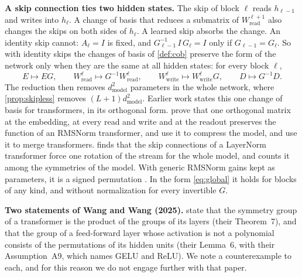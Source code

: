\documentclass[10pt]{article}
\theoremstyle{definition}
\theoremstyle{remark}
\newcommand{\Wread}{W_{\mathrm{read}}}
\newcommand{\Wwrite}{W_{\mathrm{write}}}
\newcommand{\dm}{d_{\mathrm{model}}}
\newcommand{\para}[1]{\smallskip\noindent\textbf{#1}\hspace{0.5em}}
\begin{document}
\para{A skip connection ties two hidden states.} The skip of block $\ell$ reads $h_{\ell-1}$ and writes into $h_\ell$. A change of basis that reduces a submatrix of $\Wread^{\ell+1}$ also changes the skips on both sides of $h_\ell$. A learned skip absorbs the change. An identity skip cannot: $A_\ell = I$ is fixed, and $G_{\ell-1}^{-1}\,I\,G_\ell = I$ only if $G_{\ell-1} = G_\ell$. So with identity skips the changes of basis of \cref{def:cob} preserve the form of the network only when they are the same at all hidden states: for every block $\ell$,
\begin{equation}\label{eq:global}
E \mapsto EG, \qquad \Wread^{\ell} \mapsto G^{-1}\Wread^{\ell}, \qquad \Wwrite^{\ell} \mapsto \Wwrite^{\ell}G, \qquad D \mapsto G^{-1}D .
\end{equation}
The reduction then removes $\dm^2$ parameters in the whole network, where \cref{prop:skipless} removes $(L+1)\dm^2$. Earlier work states this one change of basis for transformers, in its orthogonal form. \citet[Theorem~1]{ashkboos2024slicegpt} prove that one orthogonal matrix at the embedding, at every read and write and at the readout preserves the function of an RMSNorm transformer, and use it to compress the model, and \citet{theus2025glmc} use it to merge transformers. \citet{vannierop2024gauge} finds that the skip connections of a LayerNorm transformer force one rotation of the stream for the whole model, and counts it among the symmetries of the model. With generic RMSNorm gains kept as parameters, it is a signed permutation \citep[Theorem~2.1]{sweeney2026transport}. In the form \eqref{eq:global} it holds for blocks of any kind, and without normalization for every invertible $G$.

\para{Two statements of Wang and Wang (2025).} \citet{wang2025gauge} state that the symmetry group of a transformer is the product of the groups of its layers (their Theorem~7), and that the group of a feed-forward layer whose activation is not a polynomial consists of the permutations of its hidden units (their Lemma~6, with their Assumption~A9, which names GELU and ReLU). We note a counterexample to each, and for this reason we do not engage further with that paper.
\end{document}
